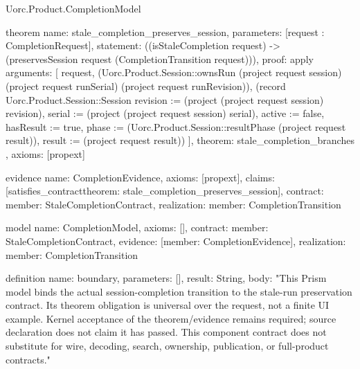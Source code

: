 \begin{lexlean}{Uorc.Product.CompletionModel}
\begin{semanticmodule}
theorem{
  name: stale_completion_preserves_session,
  parameters: [request : CompletionRequest],
  statement: ((isStaleCompletion request) -> (preservesSession request (CompletionTransition request))),
  proof: apply{
    arguments: [
      request,
      (Uorc.Product.Session::ownsRun (project request session) (project request runSerial) (project request runRevision)),
      (record Uorc.Product.Session::Session {revision := (project (project request session) revision), serial := (project (project request session) serial), active := false, hasResult := true, phase := (Uorc.Product.Session::resultPhase (project request result)), result := (project request result)})
    ],
    theorem: stale_completion_branches
  },
  axioms: [propext]
}

evidence{
  name: CompletionEvidence,
  axioms: [propext],
  claims: [satisfies_contract{theorem: stale_completion_preserves_session}],
  contract: {member: StaleCompletionContract},
  realization: {member: CompletionTransition}
}

model{
  name: CompletionModel,
  axioms: [],
  contract: {member: StaleCompletionContract},
  evidence: [{member: CompletionEvidence}],
  realization: {member: CompletionTransition}
}

definition{
  name: boundary,
  parameters: [],
  result: String,
  body: "This Prism model binds the actual session-completion transition to the stale-run preservation contract. Its theorem obligation is universal over the request, not a finite UI example. Kernel acceptance of the theorem/evidence remains required; source declaration does not claim it has passed. This component contract does not substitute for wire, decoding, search, ownership, publication, or full-product contracts."
}
\end{semanticmodule}
\end{lexlean}
